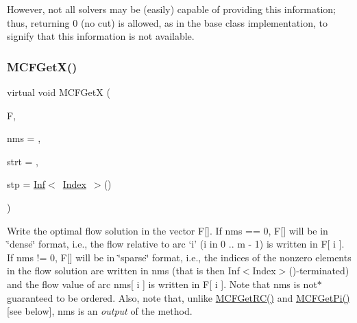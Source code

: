 However, not all solvers may be (easily) capable of providing this information; thus, returning 0 (no cut) is allowed, as in the base class implementation, to signify that this information is not available. \mbox{\label{class_m_c_f_class_a884f1180138ddf3df909347b1c85428c}} 
\subsubsection{\texorpdfstring{M\+C\+F\+Get\+X()}{MCFGetX()}\hspace{0.1cm}{\footnotesize\ttfamily [1/2]}}
{\footnotesize\ttfamily virtual void M\+C\+F\+GetX (\begin{DoxyParamCaption}\item[{\mbox{\hyperlink{class_m_c_f_class_a9dae1f1a39c208ce3c2b337cd5bb3d00}{F\+Row}}}]{F,  }\item[{\mbox{\hyperlink{class_m_c_f_class_ace3388eb329ff0551a0b86b6c67e33d8}{Index\+\_\+\+Set}}}]{nms = {},  }\item[{\mbox{\hyperlink{class_m_c_f_class_a76aaabb20535c51a2752b93f6c38fe54}{c\+Index}}}]{strt = {},  }\item[{\mbox{\hyperlink{class_m_c_f_class_ad53d6229d7ec28555a9c9c2fd9abf773}{Index}}}]{stp = {\ttfamily \mbox{\hyperlink{class_o_p_ttypes__di__unipi__it_1_1_inf}{Inf}}$<$~\mbox{\hyperlink{class_m_c_f_class_ad53d6229d7ec28555a9c9c2fd9abf773}{Index}}~$>$()} }\end{DoxyParamCaption})\hspace{0.3cm}{\ttfamily [pure virtual]}}

Write the optimal flow solution in the vector F\mbox{[}\mbox{]}. If nms == 0, F\mbox{[}\mbox{]} will be in \char`\"{}dense\char`\"{} format, i.\+e., the flow relative to arc `i' (i in 0 .. m -\/ 1) is written in F\mbox{[} i \mbox{]}. If nms != 0, F\mbox{[}\mbox{]} will be in \char`\"{}sparse\char`\"{} format, i.\+e., the indices of the nonzero elements in the flow solution are written in nms (that is then Inf$<$\+Index$>$()-\/terminated) and the flow value of arc nms\mbox{[} i \mbox{]} is written in F\mbox{[} i \mbox{]}. Note that nms is not$\ast$ guaranteed to be ordered. Also, note that, unlike \mbox{\hyperlink{class_m_c_f_class_af027cee8179a876a4879c73820c380d1}{M\+C\+F\+Get\+R\+C()}} and \mbox{\hyperlink{class_m_c_f_class_a8f1a95d5c707f83ffc6aecba1e7e0e10}{M\+C\+F\+Get\+Pi()}} \mbox{[}see below\mbox{]}, nms is an {\itshape output} of the method.

